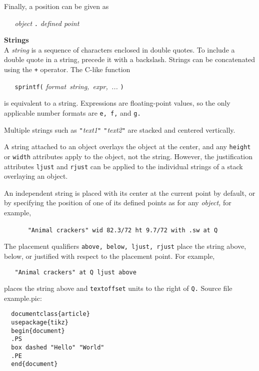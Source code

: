 Finally, a position can be given as

{\it \ \ \ object}
{\tt .}
{\it defined point}
\par\hskip-2pc{\bf Strings}\\
A
{\it string}
is a sequence of characters enclosed in double quotes.
To include a double quote in a string, precede it with a backslash. Strings
can be concatenated using the
{\tt +}
operator.
The C-like function

{\tt \ \ \ sprintf(}
{\it format\ string,\ expr,\ ...}
{\tt )}

is equivalent to a string.
Expressions are floating-point values, so the only applicable number
formats are
{\tt e,\ f,}
and
{\tt g.}

Multiple strings such as
{\it {\tt "}text1{\tt "} {\tt "}text2{\tt "}}
are stacked and centered vertically.

A string attached to an object overlays the object at the center, and
any
{\tt height}
or
{\tt width}
attributes apply to the object, not the string.
However, the justification attributes
{\tt ljust}
and
{\tt rjust}
can be applied to the individual strings of a stack overlaying
an object.

An independent string is placed with its center at the current point
by default, or by specifying the position of one of its defined points
as for any
{\it object,}
for example,

{\tt \ \ \ }
{\tt \ \ \ {\tt "}Animal\ crackers{\tt "}\ wid\ 82.3/72\ ht\ 9.7/72\ with\ .sw\ at\ Q}

The placement qualifiers
{\tt above,\ below,\ ljust,\ rjust}
place the string above, below, or justified with respect to the
placement point.
For example,

{\tt \ \ \ {\tt "}Animal\ crackers{\tt "}\ at\ Q\ ljust\ above}

places the string above and
{\tt textoffset}
units to the right of
{\tt Q.}
Source file example.pic:

{\tt \ \ {\tt {}}documentclass\{article\}}
\\\hbox{}\hskip-1pt
{\tt \ \ {\tt {}}usepackage\{tikz\}}
\\\hbox{}\hskip-1pt
{\tt \ \ {\tt {}}begin\{document\}}
\\\hbox{}\hskip-1pt
{\tt \ \ .PS}
\\\hbox{}\hskip-1pt
{\tt \ \ box\ dashed\ {\tt "}Hello{\tt "}\ {\tt "}World{\tt "}}
\\\hbox{}\hskip-1pt
{\tt \ \ .PE}
\\\hbox{}\hskip-1pt
{\tt \ \ {\tt {}}end\{document\}}

